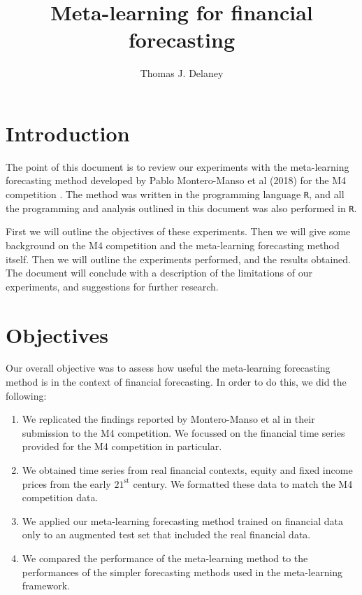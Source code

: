 \documentclass[a4paper,12pt]{article}
\title{Meta-learning for financial forecasting}
\date{}
\author{Thomas J. Delaney}
\theoremstyle{definition}
\begin{document}
\maketitle

\tableofcontents

\newpage

\section{Introduction}
The point of this document is to review our experiments with the meta-learning forecasting method developed by Pablo Montero-Manso et al (2018) \cite{montero} for the M4 competition \cite{m4}. The method was written in the programming language \texttt{R}, and all the programming and analysis outlined in this document was also performed in \texttt{R}.

First we will outline the objectives of these experiments. Then we will give some background on the M4 competition and the meta-learning forecasting method itself. Then we will outline the experiments performed, and the results obtained. The document will conclude with a description of the limitations of our experiments, and suggestions for further research.

\section{Objectives}\label{sec:objectives}
Our overall objective was to assess how useful the meta-learning forecasting method is in the context of financial forecasting. In order to do this, we did the following:
\begin{enumerate}
	\item We replicated the findings reported by Montero-Manso et al in their submission to the M4 competition. We focussed on the financial time series provided for the M4 competition in particular.
	\item We obtained time series from real financial contexts, equity and fixed income prices from the early $21^{\text{st}}$ century. We formatted these data to match the M4 competition data.
	\item We applied our meta-learning forecasting method trained on financial data only to an augmented test set that included the real financial data.
	\item We compared the performance of the meta-learning method to the performances of the simpler forecasting methods used in the meta-learning framework.
\end{enumerate}
\end{document}
